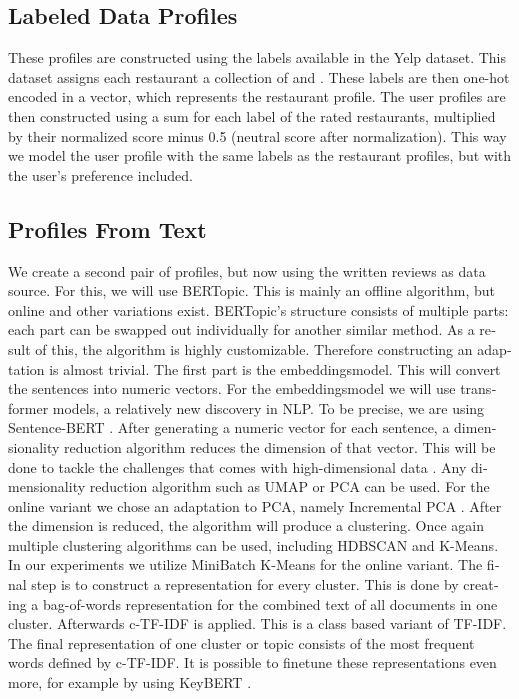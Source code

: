 \begin{otherlanguage}{english}
\begin{multicols}{2}
\subsection*{Labeled Data Profiles}
These profiles are constructed using the labels available in the Yelp dataset. This dataset assigns each restaurant a collection of  and . These labels are then one-hot encoded in a vector, which represents the restaurant profile. The user profiles are then constructed using a sum for each label of the rated restaurants, multiplied by their normalized score minus 0.5 (neutral score after normalization). This way we model the user profile with the same labels as the restaurant profiles, but with the user's preference included.

\subsection*{Profiles From Text}
We create a second pair of profiles, but now using the written reviews as data source. For this, we will use BERTopic. \cite{bertopic_paper_eng_summary} This is mainly an offline algorithm, but online and other variations exist. BERTopic's structure consists of multiple parts: each part can be swapped out individually for another similar method. As a result of this, the algorithm is highly customizable. Therefore constructing an adaptation is almost trivial. The first part is the embeddingsmodel. This will convert the sentences into numeric vectors. For the embeddingsmodel we will use transformer models, a relatively new discovery in NLP. To be precise, we are using Sentence-BERT \cite{sentence_bert_eng_summary}. \newline
After generating a numeric vector for each sentence, a dimensionality reduction algorithm reduces the dimension of that vector. This will be done to tackle the challenges that comes with high-dimensional data \cite{curse_of_dim_eng_summary}. Any dimensionality reduction algorithm such as UMAP or PCA can be used. For the online variant we chose an adaptation to PCA, namely Incremental PCA \cite{ipca_eng_summary}.\newline
After the dimension is reduced, the algorithm will produce a clustering. Once again multiple clustering algorithms can be used, including HDBSCAN and K-Means. In our experiments we utilize MiniBatch K-Means \cite{kmeans_minibatch_eng_summary} for the online variant. \newline
The final step is to construct a representation for every cluster. This is done by creating a bag-of-words representation for the combined text of all documents in one cluster. Afterwards c-TF-IDF \cite{bertopic_c_tf_idf_eng_summary} is applied. This is a class based variant of TF-IDF. The final representation of one cluster or topic consists of the most frequent words defined by c-TF-IDF. It is possible to finetune these representations even more, for example by using KeyBERT \cite{keybert_eng_summary}.


\end{multicols}
\end{otherlanguage}
